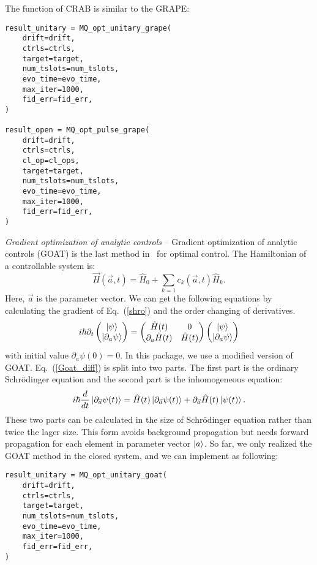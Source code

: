 The function of CRAB is similar to the GRAPE:
\begin{lstlisting}
result_unitary = MQ_opt_unitary_grape(
    drift=drift,
    ctrls=ctrls,
    target=target,
    num_tslots=num_tslots,
    evo_time=evo_time,
    max_iter=1000,
    fid_err=fid_err,
)

result_open = MQ_opt_pulse_grape(
    drift=drift,
    ctrls=ctrls,
    cl_op=cl_ops,
    target=target,
    num_tslots=num_tslots,
    evo_time=evo_time,
    max_iter=1000,
    fid_err=fid_err,
)
\end{lstlisting}

\textit{Gradient optimization of analytic controls} -- Gradient optimization of analytic controls (GOAT) is the last method in \MindQuantum\ for optimal control. The Hamiltonian of a controllable system is:
\begin{equation}
    \vec{H}(\vec{a},t)=\hat{H}_{0}+\sum_{k=1}c_{k}(\vec{a},t)\hat{H}_{k}.
\end{equation}
Here, $\vec{a}$ is the parameter vector. We can get the following equations by calculating the gradient of Eq.~(\ref{shro}) and the order changing of derivatives.
\begin{equation}
    i\hbar\partial_{t}
    \begin{pmatrix}
        \ket{\psi} \\
        \ket{\partial_{a}\psi}
    \end{pmatrix}
    =
    \begin{pmatrix}
        \hat{H}(t)             & 0          \\
        \partial_{a}\hat{H}(t) & \hat{H}(t)
    \end{pmatrix}
    \begin{pmatrix}
        \ket{\psi} \\
        \ket{\partial_{a}\psi}
    \end{pmatrix}
    \label{Goat_diff}
\end{equation}
with initial value $\partial_{a}\psi(0)=0$. In this package, we use a modified version of GOAT. Eq.~(\ref{Goat_diff}) is split into two parts. The first part is the ordinary Schrödinger equation and the second part is the inhomogeneous equation:
\begin{equation}
    i\hbar\frac{d}{dt}\ket{\partial_{\vec{a}}\psi(t)}=\hat{H}(t)\ket{\partial_{\vec{a}}\psi(t)}+\partial_{\vec{a}}\hat{H}(t)\ket{\psi(t)}.
\end{equation}
These two parts can be calculated in the size of Schrödinger equation rather than twice the lager size. This form avoids background propagation but needs forward propagation for each element in parameter vector $\ket{a}$. So far, we only realized the GOAT method in the closed system, and we can implement as following:
\begin{lstlisting}
result_unitary = MQ_opt_unitary_goat(
    drift=drift,
    ctrls=ctrls,
    target=target,
    num_tslots=num_tslots,
    evo_time=evo_time,
    max_iter=1000,
    fid_err=fid_err,
)
\end{lstlisting}
